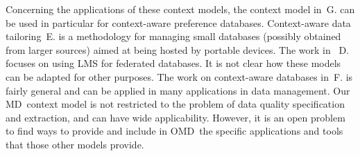 \documentclass[format=acmsmall, review=false, screen=true]{acmart}
\newcommand{\omd}{OMD}
\newcommand{\md}{MD}
\begin{document}
Concerning the applications of these context models, the context model in~G. can be used in particular for context-aware preference databases. Context-aware data tailoring~E. is  a methodology for managing small databases (possibly obtained from larger sources) aimed at being hosted by portable devices. The work in ~D. focuses on using LMS for federated databases. It is not clear how these models can be adapted for other purposes. The work on context-aware databases in~F. is fairly general and can be applied in many applications in data management.  Our \md \ context model is not restricted to the problem of data quality specification and extraction, and can have wide applicability. However, it is an open problem to find ways to provide and include in \omd \ the specific applications and tools that those other models provide.
\end{document}
